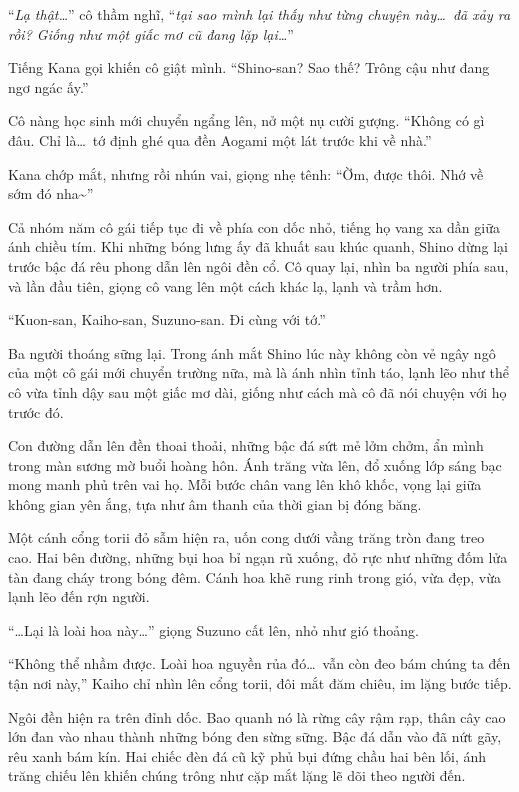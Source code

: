 \documentclass[../main.tex]{subfiles}
\begin{document}
``\textit{Lạ thật\dots}'' cô thầm nghĩ, ``\textit{tại sao mình lại thấy như từng chuyện này\dots\ đã xảy ra rồi? Giống như một giấc mơ cũ đang lặp lại\dots}''

Tiếng Kana gọi khiến cô giật mình. ``Shino-san? Sao thế? Trông cậu như đang ngơ ngác ấy.''

Cô nàng học sinh mới chuyển ngẩng lên, nở một nụ cười gượng. ``Không có gì đâu. Chỉ là\dots\ tớ định ghé qua đền Aogami một lát trước khi về nhà.''

Kana chớp mắt, nhưng rồi nhún vai, giọng nhẹ tênh: ``Ờm, được thôi. Nhớ về sớm đó nha\~{}''

Cả nhóm năm cô gái tiếp tục đi về phía con dốc nhỏ, tiếng họ vang xa dần giữa ánh chiều tím. Khi những bóng lưng ấy đã khuất sau khúc quanh, Shino dừng lại trước bậc đá rêu phong dẫn lên ngôi đền cổ. Cô quay lại, nhìn ba người phía sau, và lần đầu tiên, giọng cô vang lên một cách khác lạ, lạnh và trầm hơn.

``Kuon-san, Kaiho-san, Suzuno-san. Đi cùng với tớ.''

Ba người thoáng sững lại. Trong ánh mắt Shino lúc này không còn vẻ ngây ngô của một cô gái mới chuyển trường nữa, mà là ánh nhìn tỉnh táo, lạnh lẽo như thể cô vừa tỉnh dậy sau một giấc mơ dài, giống như cách mà cô đã nói chuyện với họ trước đó.

Con đường dẫn lên đền thoai thoải, những bậc đá sứt mẻ lởm chởm, ẩn mình trong màn sương mờ buổi hoàng hôn. Ánh trăng vừa lên, đổ xuống lớp sáng bạc mong manh phủ trên vai họ. Mỗi bước chân vang lên khô khốc, vọng lại giữa không gian yên ắng, tựa như âm thanh của thời gian bị đóng băng.

Một cánh cổng torii đỏ sẫm hiện ra, uốn cong dưới vầng trăng tròn đang treo cao. Hai bên đường, những bụi hoa bỉ ngạn rũ xuống, đỏ rực như những đốm lửa tàn đang cháy trong bóng đêm. Cánh hoa khẽ rung rinh trong gió, vừa đẹp, vừa lạnh lẽo đến rợn người.

``\dots Lại là loài hoa này\dots'' giọng Suzuno cất lên, nhỏ như gió thoảng.

``Không thể nhầm được. Loài hoa nguyền rủa đó\dots\ vẫn còn đeo bám chúng ta đến tận nơi này,'' Kaiho chỉ nhìn lên cổng torii, đôi mắt đăm chiêu, im lặng bước tiếp.

Ngôi đền hiện ra trên đỉnh dốc. Bao quanh nó là rừng cây rậm rạp, thân cây cao lớn đan vào nhau thành những bóng đen sừng sững. Bậc đá dẫn vào đã nứt gãy, rêu xanh bám kín. Hai chiếc đèn đá cũ kỹ phủ bụi đứng chầu hai bên lối, ánh trăng chiếu lên khiến chúng trông như cặp mắt lặng lẽ dõi theo người đến.
\end{document}
